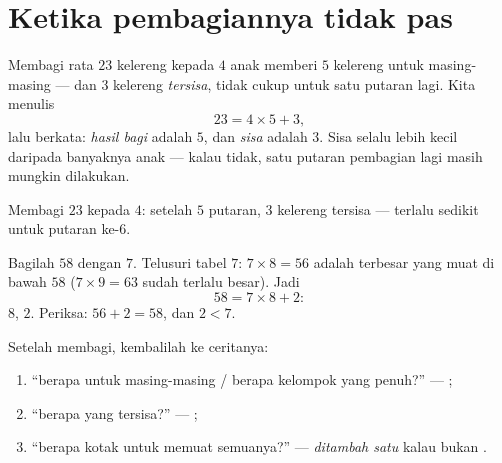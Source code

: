 \section{Ketika pembagiannya tidak pas}

\begin{definition}[Sisa]\label{def:g3:division:remainder}
Membagi rata $23$ kelereng kepada $4$ anak memberi $5$ kelereng
untuk masing-masing --- dan $3$ kelereng \emph{tersisa}, tidak cukup
untuk satu putaran lagi. Kita menulis
\[
23 = 4 \times 5 + 3 ,
\]
lalu berkata: \emph{hasil bagi} adalah $5$, dan
\emph{sisa} adalah $3$. Sisa selalu lebih kecil daripada
banyaknya anak --- kalau tidak, satu putaran pembagian lagi masih
mungkin dilakukan.
\end{definition}

\begin{omfigure}

{\small Membagi $23$ kepada $4$: setelah $5$ putaran, $3$ kelereng
tersisa --- terlalu sedikit untuk putaran ke-$6$.}
\end{omfigure}

\begin{example}\label{ex:g3:division:remainder}
Bagilah $58$ dengan $7$. Telusuri tabel $7$:
$7 \times 8 = 56$ adalah  terbesar yang muat di bawah $58$
($7 \times 9 = 63$ sudah terlalu besar). Jadi
\[
58 = 7 \times 8 + 2 :
\]
 $8$,  $2$. Periksa: $56 + 2 = 58$, dan $2 < 7$.
\end{example}

\begin{method}\label{met:g3:division:interpret}
Setelah membagi, kembalilah ke ceritanya:
\begin{enumerate}
  \item ``berapa untuk masing-masing / berapa kelompok yang penuh?''
        --- ;
  \item ``berapa yang tersisa?'' --- ;
  \item ``berapa kotak untuk memuat semuanya?'' --- 
        \emph{ditambah satu} kalau  bukan .
\end{enumerate}
\end{method}

